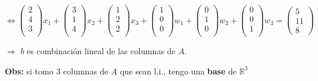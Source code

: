 \documentclass[10pt, aspectratio=169]{beamer}
\begin{document}
\begin{frame}
        \[\iff
        \begin{pmatrix}
            2 \\
            4 \\
            3 \\
        \end{pmatrix} x_1 +
        \begin{pmatrix}
            3 \\
            1 \\
            4 \\
        \end{pmatrix} x_2 +
        \begin{pmatrix}
            1 \\
            2 \\
            2 \\
        \end{pmatrix} x_3 +
        \begin{pmatrix}
            1 \\
            0 \\
            0 \\
        \end{pmatrix} w_1 +
        \begin{pmatrix}
            0 \\
            1 \\
            0 \\
        \end{pmatrix} w_2 +
        \begin{pmatrix}
            0 \\
            0 \\
            1 \\
        \end{pmatrix} w_3 =
        \begin{pmatrix}
                5 \\
                11 \\
                8
        \end{pmatrix}
        \]

        $\Rightarrow$ $b$ es combinación lineal de las columnas de $A$.
        \vspace{1em}

        \textbf{Obs:} si tomo 3 columnas de $A$ que sean l.i., tengo una \textbf{base} de $\mathbb{R}^3$

    \end{frame}
\end{document}
